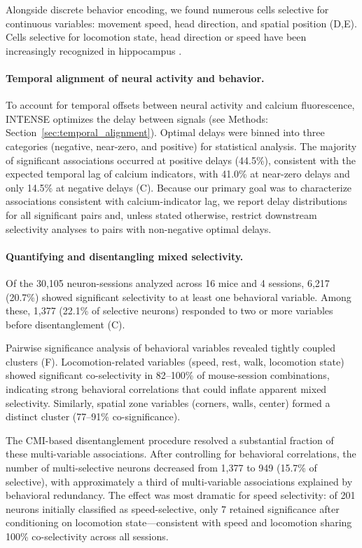 Alongside discrete behavior encoding, we found numerous cells selective for
continuous variables: movement speed, head direction, and spatial position
(D,E). Cells selective for locomotion state, head direction or speed have been increasingly recognized in
hippocampus \cite{kropff2015speed,Gois2018,Acharya2016}.

\paragraph{Temporal alignment of neural activity and behavior.}
\label{sec:temporal_results}
To account for temporal offsets between neural activity and calcium
fluorescence, INTENSE optimizes the delay between signals (see Methods:
Section~\ref{sec:temporal_alignment}).
Optimal delays were binned into three categories (negative, near-zero,
and positive) for statistical analysis. The majority of significant associations
occurred at positive delays (44.5\%), consistent with the expected temporal lag of
calcium indicators, with 41.0\% at near-zero delays and only 14.5\% at negative
delays (C). Because our primary goal was to characterize associations consistent with calcium-indicator lag, we report delay distributions for all significant pairs and, unless stated otherwise, restrict downstream selectivity analyses to pairs with non-negative optimal delays. 

\paragraph{Quantifying and disentangling mixed selectivity.}
Of the 30{,}105 neuron-sessions analyzed across 16 mice and 4 sessions, 6{,}217
(20.7\%) showed significant selectivity to at least one behavioral variable.
Among these, 1{,}377 (22.1\% of selective neurons) responded to two or more
variables before disentanglement (C).

Pairwise significance analysis of behavioral variables revealed tightly coupled
clusters (F). Locomotion-related variables (speed, rest,
walk, locomotion state) showed significant co-selectivity in 82--100\% of
mouse-session combinations, indicating strong behavioral correlations that could
inflate apparent mixed selectivity. Similarly, spatial zone variables (corners,
walls, center) formed a distinct cluster (77--91\% co-significance).

The CMI-based disentanglement procedure resolved a substantial fraction of these
multi-variable associations. After controlling for behavioral correlations, the
number of multi-selective neurons decreased from 1{,}377 to 949 (15.7\% of
selective), with approximately a third of multi-variable associations explained by
behavioral redundancy. The effect was most dramatic for speed selectivity: of 201
neurons initially classified as speed-selective, only 7 retained significance after
conditioning on locomotion state---consistent with speed and locomotion sharing
100\% co-selectivity across all sessions.

